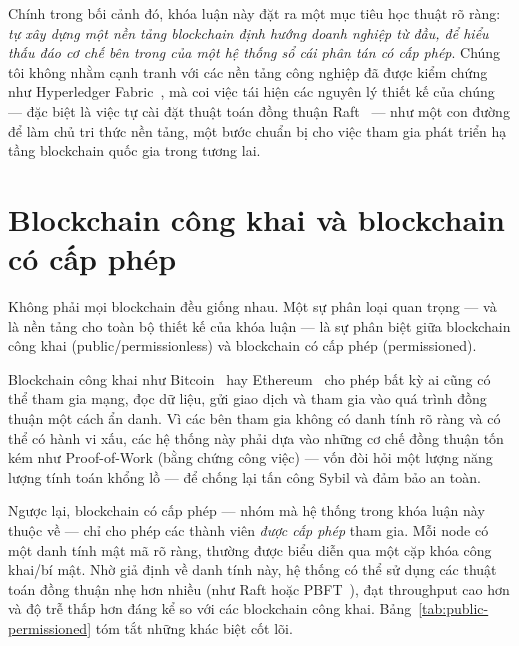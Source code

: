 Chính trong bối cảnh đó, khóa luận này đặt ra một mục tiêu học thuật rõ ràng:
\textit{tự xây dựng một nền tảng blockchain định hướng doanh nghiệp từ đầu, để
hiểu thấu đáo cơ chế bên trong của một hệ thống sổ cái phân tán có cấp phép}.
Chúng tôi không nhằm cạnh tranh với các nền tảng công nghiệp đã được kiểm chứng
như Hyperledger Fabric~\cite{androulaki2018hyperledger}, mà coi việc tái hiện
các nguyên lý thiết kế của chúng --- đặc biệt là việc tự cài đặt thuật
toán đồng thuận Raft~\cite{ongaro2014raft} --- như một con đường để làm chủ tri
thức nền tảng, một bước chuẩn bị cho việc tham gia phát triển hạ tầng blockchain
quốc gia trong tương lai.

\section{Blockchain công khai và blockchain có cấp phép}
\label{sec:public-vs-permissioned}

Không phải mọi blockchain đều giống nhau. Một sự phân loại quan trọng --- và là
nền tảng cho toàn bộ thiết kế của khóa luận --- là sự phân biệt giữa blockchain
công khai (public/permissionless) và blockchain có cấp phép
(permissioned).

Blockchain công khai như Bitcoin~\cite{nakamoto2008bitcoin} hay
Ethereum~\cite{buterin2014ethereum} cho phép bất kỳ ai cũng có thể tham gia
mạng, đọc dữ liệu, gửi giao dịch và tham gia vào quá trình đồng thuận một cách
ẩn danh. Vì các bên tham gia không có danh tính rõ ràng và có thể có hành vi
xấu, các hệ thống này phải dựa vào những cơ chế đồng thuận tốn kém như
Proof-of-Work (bằng chứng công việc) --- vốn đòi hỏi một lượng năng lượng tính
toán khổng lồ --- để chống lại tấn công Sybil và đảm bảo an toàn.

Ngược lại, blockchain có cấp phép --- nhóm mà hệ thống trong khóa luận này thuộc
về --- chỉ cho phép các thành viên \textit{được cấp phép} tham gia. Mỗi node có
một danh tính mật mã rõ ràng, thường được biểu diễn qua một cặp khóa công
khai/bí mật. Nhờ giả định về danh tính này, hệ thống có thể sử dụng các thuật
toán đồng thuận nhẹ hơn nhiều (như Raft hoặc PBFT~\cite{castro1999pbft}), đạt
throughput cao hơn và độ trễ thấp hơn đáng kể so với các blockchain công khai.
Bảng~\ref{tab:public-permissioned} tóm tắt những khác biệt cốt lõi.

